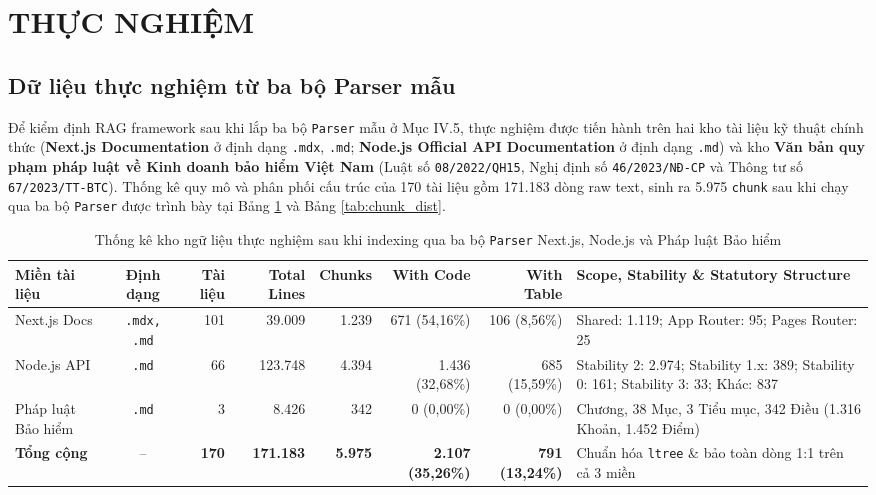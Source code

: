 \section{THỰC NGHIỆM}

\subsection{Dữ liệu thực nghiệm từ ba bộ Parser mẫu}
Để kiểm định RAG framework sau khi lắp ba bộ \texttt{Parser} mẫu ở Mục IV.5, thực nghiệm được tiến hành trên hai kho tài liệu kỹ thuật chính thức (\textbf{Next.js Documentation} ở định dạng \texttt{.mdx}, \texttt{.md}; \textbf{Node.js Official API Documentation} ở định dạng \texttt{.md}) và kho \textbf{Văn bản quy phạm pháp luật về Kinh doanh bảo hiểm Việt Nam} (Luật số \texttt{08/2022/QH15}, Nghị định số \texttt{46/2023/NĐ-CP} và Thông tư số \texttt{67/2023/TT-BTC}). Thống kê quy mô và phân phối cấu trúc của 170 tài liệu gồm 171.183 dòng raw text, sinh ra 5.975 \texttt{chunk} sau khi chạy qua ba bộ \texttt{Parser} được trình bày tại Bảng \ref{tab:corpus_stats} và Bảng \ref{tab:chunk_dist}.

\begin{table}[H]
\centering
\caption{Thống kê kho ngữ liệu thực nghiệm sau khi indexing qua ba bộ \texttt{Parser} Next.js, Node.js và Pháp luật Bảo hiểm}
\label{tab:corpus_stats}
\footnotesize\setlength{\tabcolsep}{3.5pt}\begin{tabularx}{\textwidth}{p{2.15cm}crrrrr>{\raggedright\arraybackslash}X}
\toprule
\textbf{Miền tài liệu} & \textbf{Định dạng} & \textbf{Tài liệu} & \textbf{Total Lines} & \textbf{Chunks} & \textbf{With Code} & \textbf{With Table} & \textbf{Scope, Stability \& Statutory Structure} \\
\midrule
Next.js Docs & \texttt{.mdx, .md} & 101 & 39.009 & 1.239 & 671 (54,16\%) & 106 (8,56\%) & Shared: 1.119; App Router: 95; Pages Router: 25 \\
\addlinespace[2pt]
Node.js API & \texttt{.md} & 66 & 123.748 & 4.394 & 1.436 (32,68\%) & 685 (15,59\%) & Stability 2: 2.974; Stability 1.x: 389; Stability 0: 161; Stability 3: 33; Khác: 837 \\
\addlinespace[2pt]
Pháp luật Bảo hiểm & \texttt{.md} & 3 & 8.426 & 342 & 0 (0,00\%) & 0 (0,00\%) & 22 Chương, 38 Mục, 3 Tiểu mục, 342 Điều (1.316 Khoản, 1.452 Điểm) \\
\midrule
\textbf{Tổng cộng} & -- & \textbf{170} & \textbf{171.183} & \textbf{5.975} & \textbf{2.107 (35,26\%)} & \textbf{791 (13,24\%)} & Chuẩn hóa \texttt{ltree} \& bảo toàn dòng 1:1 trên cả 3 miền \\
\bottomrule
\end{tabularx}
\end{table}

